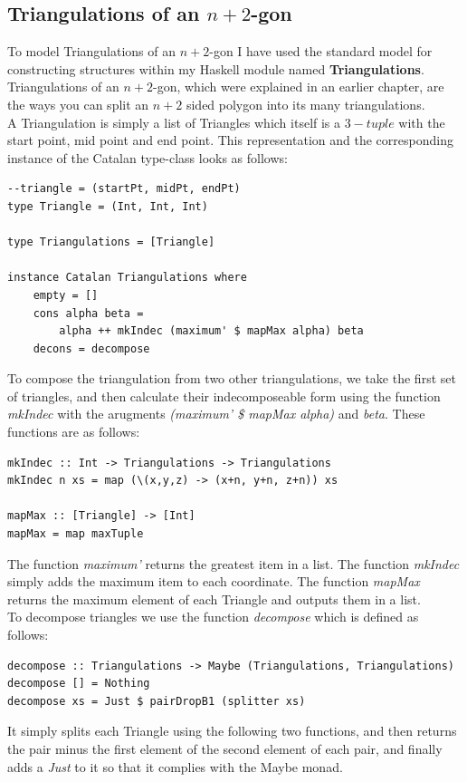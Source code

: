 \documentclass[12pt]{article}
\begin{document}
\subsection{Triangulations of an $n+2$-gon}
To model Triangulations of an $n+2$-gon I have used the standard model for constructing structures within my Haskell module named {\bf Triangulations}.\\
Triangulations of an $n+2$-gon, which were explained in an earlier chapter, are the ways you can split an $n+2$ sided polygon into its many triangulations.\\
A Triangulation is simply a list of Triangles which itself is a $3-tuple$ with the start point, mid point and end point. This representation and the corresponding instance of the Catalan type-class looks as follows:
\begin{lstlisting}
--triangle = (startPt, midPt, endPt)
type Triangle = (Int, Int, Int)

type Triangulations = [Triangle]

instance Catalan Triangulations where
	empty = []	
	cons alpha beta = 
		alpha ++ mkIndec (maximum' $ mapMax alpha) beta
	decons = decompose
\end{lstlisting}
To compose the triangulation from two other triangulations, we take the first set of triangles, and then calculate their indecomposeable form using the function {\it mkIndec} with the arugments {\it (maximum' \$ mapMax alpha)} and {\it beta}. These functions are as follows:
\begin{lstlisting}
mkIndec :: Int -> Triangulations -> Triangulations
mkIndec n xs = map (\(x,y,z) -> (x+n, y+n, z+n)) xs

mapMax :: [Triangle] -> [Int]
mapMax = map maxTuple
\end{lstlisting}
The function {\it maximum'} returns the greatest item in a list. The function {\it mkIndec} simply adds the maximum item to each coordinate. The function {\it mapMax} returns the maximum element of each Triangle and outputs them in a list.\\
To decompose triangles we use the function {\it decompose} which is defined as follows:
\begin{lstlisting}
decompose :: Triangulations -> Maybe (Triangulations, Triangulations)
decompose [] = Nothing
decompose xs = Just $ pairDropB1 (splitter xs)
\end{lstlisting}
It simply splits each Triangle using the following two functions, and then returns the pair minus the first element of the second element of each pair, and finally adds a {\it Just} to it so that it complies with the Maybe monad.
\end{document}
